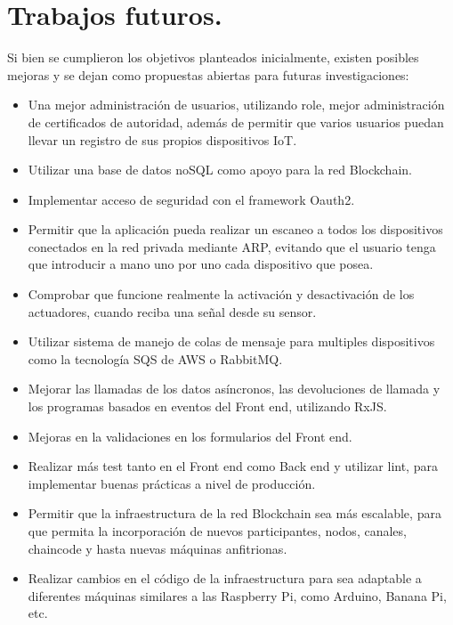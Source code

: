 \section{Trabajos futuros.}

Si bien se cumplieron los objetivos planteados inicialmente, existen posibles mejoras y se dejan como propuestas abiertas
para futuras investigaciones:

\begin{itemize}
  \item Una mejor administración de usuarios, utilizando role, mejor administración de certificados de autoridad, además
  de permitir que varios usuarios puedan llevar un registro de sus propios dispositivos IoT.
  \item Utilizar una base de datos noSQL como apoyo para la red Blockchain.
  \item Implementar acceso de seguridad con el framework Oauth2.
  \item Permitir que la aplicación pueda realizar un escaneo a todos los dispositivos conectados en la red privada mediante 
  ARP, evitando que el usuario tenga que introducir a mano uno por uno cada dispositivo que posea.
  \item Comprobar que funcione realmente la activación y desactivación de los actuadores, cuando reciba una señal desde su 
  sensor.
  \item Utilizar sistema de manejo de colas de mensaje para multiples dispositivos como la tecnología SQS de AWS o RabbitMQ.
  \item Mejorar las llamadas de los datos asíncronos, las devoluciones de llamada y los programas basados en eventos del 
  Front end, utilizando RxJS.
  \item Mejoras en la validaciones en los formularios del Front end.
  \item Realizar más test tanto en el Front end como Back end y utilizar lint, para implementar buenas prácticas a nivel de 
  producción.
  \item Permitir que la infraestructura de la red Blockchain sea más escalable, para que permita la incorporación de nuevos 
  participantes, nodos, canales, chaincode y hasta nuevas máquinas anfitrionas.
  \item Realizar cambios en el código de la infraestructura para sea adaptable a diferentes máquinas similares a las 
  Raspberry Pi, como Arduino, Banana Pi, etc.
\end{itemize}

\newpage

